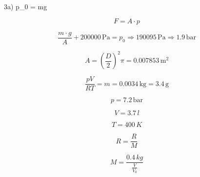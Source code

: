 3a) \quad p_0 = mg

\[
F = A \cdot p
\]

\[
\frac{m \cdot g}{A} + 200000 \, \text{Pa} = p_0 \Rightarrow 190095 \, \text{Pa} \Rightarrow 1.9 \, \text{bar}
\]

\[
A = \left( \frac{D}{2} \right)^2 \pi = 0.007853 \, \text{m}^2
\]

\[
\frac{pV}{RT} = m = 0.0034 \, \text{kg} = 3.4 \, \text{g}
\]

\[
p = 7.2 \, \text{bar}
\]

\[
V = 3.7 \, l
\]

\[
T = 400 \, K
\]

\[
R = \frac{R}{M}
\]

\[
M = \frac{0.4 \, kg}{\frac{V}{V_0}}
\]